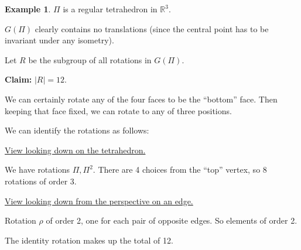 \documentclass{article}
\theoremstyle{definition} \newtheorem*{definition}{Definition}
\newtheorem*{exmp}{Example} \newtheorem*{exmps}{Examples}
\newcommand{\reals}{\mathbb{R}} \newcommand{\rationals}{\mathbb{Q}}
\begin{document}
  \begin{exmp} $\Pi$ is a regular tetrahedron in $\reals^3$.

    $G(\Pi)$ clearly contains no translations (since the central point has to
    be invariant under any isometry).

    Let $R$ be the subgroup of all rotations in $G(\Pi)$.

    \textbf{Claim:} $|R|=12$.

    We can certainly rotate any of the four faces to be the ``bottom'' face.
    Then keeping that face fixed, we can rotate to any of three positions.

    We can identify the rotations as follows:

    \underline{View looking down on the tetrahedron.}

    \begin{figure}[h] \centering {} \label{fig:lookingdown} \end{figure}


    We have rotations $\Pi, \Pi^2$. There are 4 choices from the ``top''
    vertex, so 8 rotations of order 3.

    \underline{View looking down from the perspective on an edge.}
    \begin{figure}[h] \centering {} \label{fig:lookingdownedge} \end{figure}

    Rotation $\rho$ of order 2, one for each pair of opposite edges. So
    elements of order 2.

    The identity rotation makes up the total of 12.  \end{exmp}
\end{document}
